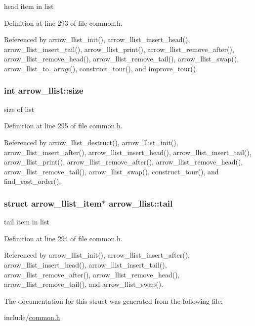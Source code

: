 head item in list 

Definition at line 293 of file common.h.

Referenced by arrow\_\-llist\_\-init(), arrow\_\-llist\_\-insert\_\-head(), arrow\_\-llist\_\-insert\_\-tail(), arrow\_\-llist\_\-print(), arrow\_\-llist\_\-remove\_\-after(), arrow\_\-llist\_\-remove\_\-head(), arrow\_\-llist\_\-remove\_\-tail(), arrow\_\-llist\_\-swap(), arrow\_\-llist\_\-to\_\-array(), construct\_\-tour(), and improve\_\-tour().\hypertarget{structarrow__llist_89bdc72883d1d24717445c8087b6b0dc}{
\subsubsection[{size}]{\setlength{\rightskip}{0pt plus 5cm}int {\bf arrow\_\-llist::size}}}
\label{structarrow__llist_89bdc72883d1d24717445c8087b6b0dc}


size of list 

Definition at line 295 of file common.h.

Referenced by arrow\_\-llist\_\-destruct(), arrow\_\-llist\_\-init(), arrow\_\-llist\_\-insert\_\-after(), arrow\_\-llist\_\-insert\_\-head(), arrow\_\-llist\_\-insert\_\-tail(), arrow\_\-llist\_\-print(), arrow\_\-llist\_\-remove\_\-after(), arrow\_\-llist\_\-remove\_\-head(), arrow\_\-llist\_\-remove\_\-tail(), arrow\_\-llist\_\-swap(), construct\_\-tour(), and find\_\-cost\_\-order().\hypertarget{structarrow__llist_17aad561a27cd835fef598e8ffd135c8}{
\subsubsection[{tail}]{\setlength{\rightskip}{0pt plus 5cm}struct {\bf arrow\_\-llist\_\-item}$\ast$ {\bf arrow\_\-llist::tail}}}
\label{structarrow__llist_17aad561a27cd835fef598e8ffd135c8}


tail item in list 

Definition at line 294 of file common.h.

Referenced by arrow\_\-llist\_\-init(), arrow\_\-llist\_\-insert\_\-after(), arrow\_\-llist\_\-insert\_\-head(), arrow\_\-llist\_\-insert\_\-tail(), arrow\_\-llist\_\-remove\_\-after(), arrow\_\-llist\_\-remove\_\-head(), arrow\_\-llist\_\-remove\_\-tail(), and arrow\_\-llist\_\-swap().

The documentation for this struct was generated from the following file:\begin{CompactItemize}
\item 
include/\hyperlink{common_8h}{common.h}\end{CompactItemize}
